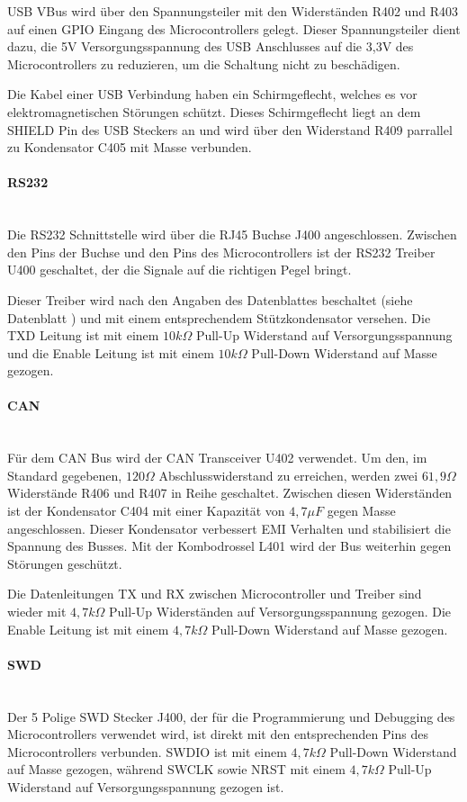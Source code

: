 \ac{USB} VBus wird über den Spannungsteiler mit den Widerständen R402 und R403 auf einen \ac{GPIO} Eingang des Microcontrollers
gelegt. Dieser Spannungsteiler dient dazu, die 5V Versorgungsspannung des \ac{USB} Anschlusses auf die 3,3V des Microcontrollers
zu reduzieren, um die Schaltung nicht zu beschädigen.

Die Kabel einer \ac{USB} Verbindung haben ein Schirmgeflecht, welches es vor elektromagnetischen Störungen schützt. Dieses 
Schirmgeflecht liegt an dem SHIELD Pin des \ac{USB} Steckers an und wird über den Widerstand R409 parrallel zu Kondensator 
C405 mit Masse verbunden. 

\paragraph{RS232}\mbox{}\\
Die RS232 Schnittstelle wird über die RJ45 Buchse J400 angeschlossen. Zwischen den Pins der Buchse und den Pins des Microcontrollers
ist der RS232 Treiber U400 geschaltet, der die Signale auf die richtigen Pegel bringt.

Dieser Treiber wird nach den Angaben des Datenblattes beschaltet (siehe Datenblatt \cite{max3221}) und mit einem entsprechendem 
Stützkondensator versehen. Die TXD Leitung ist mit einem \(10k\Omega\) Pull-Up Widerstand auf Versorgungsspannung und 
die Enable Leitung ist mit einem \(10k\Omega\) Pull-Down Widerstand auf Masse gezogen.

\paragraph{CAN}\mbox{}\\
Für dem \ac{CAN} Bus wird der \ac{CAN} Transceiver U402 verwendet. Um den, im Standard gegebenen, \(120\Omega\) 
Abschlusswiderstand zu erreichen, werden zwei \(61,9\Omega\) Widerstände R406 und R407 in Reihe geschaltet. Zwischen
diesen Widerständen ist der Kondensator C404 mit einer Kapazität von \(4,7\mu F\) gegen Masse angeschlossen. Dieser Kondensator
verbessert EMI Verhalten und stabilisiert die Spannung des Busses. Mit der Kombodrossel L401 wird der Bus weiterhin gegen 
Störungen geschützt.

Die Datenleitungen TX und RX zwischen Microcontroller und Treiber sind wieder mit \(4,7k\Omega\) Pull-Up Widerständen auf
Versorgungsspannung gezogen. Die Enable Leitung ist mit einem \(4,7k\Omega\) Pull-Down Widerstand auf Masse gezogen.

\paragraph{SWD}\mbox{}\\
Der 5 Polige \ac{SWD} Stecker J400, der für die Programmierung und Debugging des Microcontrollers verwendet wird, ist direkt
mit den entsprechenden Pins des Microcontrollers verbunden. SWDIO ist mit einem \(4,7k\Omega\) Pull-Down Widerstand auf Masse
gezogen, während SWCLK sowie NRST mit einem \(4,7k\Omega\) Pull-Up Widerstand auf Versorgungsspannung gezogen ist. 

